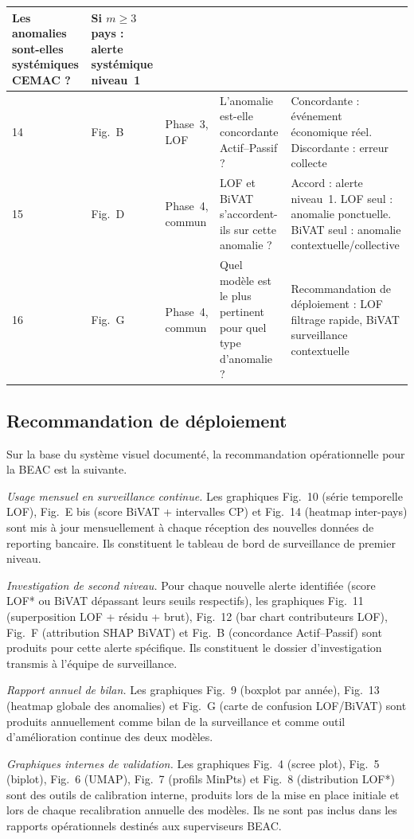 \documentclass[12pt,a4paper]{article}
\begin{document}
\begin{table}[ht]
\begin{tabular}{p{0.5cm}p{1.8cm}p{2cm}p{4cm}p{5cm}}
Les anomalies sont-elles systémiques CEMAC ? &
Si $m \geq 3$ pays : alerte systémique niveau~1 \\
\midrule
14 & Fig.~B & Phase~3, LOF &
L'anomalie est-elle concordante Actif--Passif ? &
Concordante : événement économique réel. Discordante : erreur collecte \\
\midrule
15 & Fig.~D & Phase~4, commun &
LOF et BiVAT s'accordent-ils sur cette anomalie ? &
Accord : alerte niveau~1. LOF seul : anomalie ponctuelle.
BiVAT seul : anomalie contextuelle/collective \\
\midrule
16 & Fig.~G & Phase~4, commun &
Quel modèle est le plus pertinent pour quel type d'anomalie ? &
Recommandation de déploiement : LOF filtrage rapide,
BiVAT surveillance contextuelle \\
\bottomrule
\end{tabular}
\end{table}

\subsection{Recommandation de déploiement}

Sur la base du système visuel documenté, la recommandation opérationnelle
pour la BEAC est la suivante.

\textit{Usage mensuel en surveillance continue.} Les graphiques Fig.~10
(série temporelle LOF), Fig.~E bis (score BiVAT + intervalles CP) et
Fig.~14 (heatmap inter-pays) sont mis à jour mensuellement à chaque
réception des nouvelles données de reporting bancaire. Ils constituent
le tableau de bord de surveillance de premier niveau.

\textit{Investigation de second niveau.} Pour chaque nouvelle alerte
identifiée (score LOF* ou BiVAT dépassant leurs seuils respectifs), les
graphiques Fig.~11 (superposition LOF + résidu + brut), Fig.~12 (bar chart
contributeurs LOF), Fig.~F (attribution SHAP BiVAT) et Fig.~B (concordance
Actif--Passif) sont produits pour cette alerte spécifique. Ils constituent
le dossier d'investigation transmis à l'équipe de surveillance.

\textit{Rapport annuel de bilan.} Les graphiques Fig.~9 (boxplot par année),
Fig.~13 (heatmap globale des anomalies) et Fig.~G (carte de confusion
LOF/BiVAT) sont produits annuellement comme bilan de la surveillance et
comme outil d'amélioration continue des deux modèles.

\textit{Graphiques internes de validation.} Les graphiques Fig.~4 (scree
plot), Fig.~5 (biplot), Fig.~6 (UMAP), Fig.~7 (profils MinPts) et Fig.~8
(distribution LOF*) sont des outils de calibration interne, produits lors
de la mise en place initiale et lors de chaque recalibration annuelle des
modèles. Ils ne sont pas inclus dans les rapports opérationnels destinés
aux superviseurs BEAC.
\end{document}

